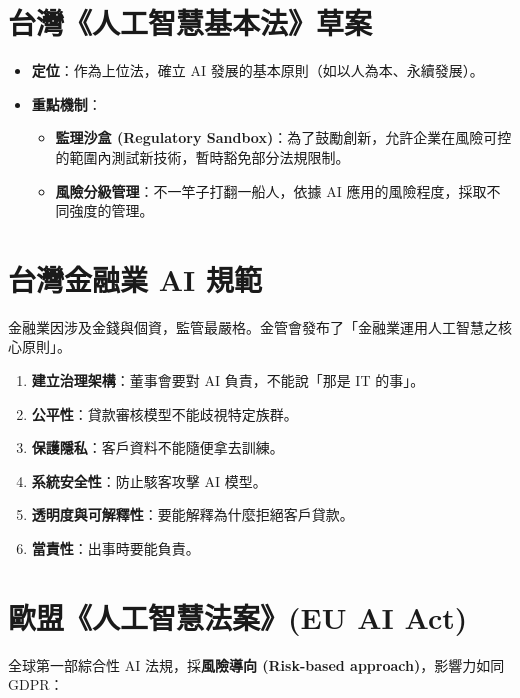 \documentclass[
  letterpaper,
  DIV=11,
  numbers=noendperiod]{scrreprt}
\providecommand{\tightlist}{%
  \setlength{\itemsep}{0pt}\setlength{\parskip}{0pt}}
\begin{document}
\section{台灣《人工智慧基本法》草案}\label{sec-taiwan-ai-law}

\begin{itemize}
\tightlist
\item
  \textbf{定位}：作為上位法，確立 AI
  發展的基本原則（如以人為本、永續發展）。
\item
  \textbf{重點機制}：

  \begin{itemize}
  \tightlist
  \item
    \textbf{監理沙盒 (Regulatory
    Sandbox)}：為了鼓勵創新，允許企業在風險可控的範圍內測試新技術，暫時豁免部分法規限制。
  \item
    \textbf{風險分級管理}：不一竿子打翻一船人，依據 AI
    應用的風險程度，採取不同強度的管理。
  \end{itemize}
\end{itemize}

\section{台灣金融業 AI 規範}\label{sec-financial-ai}

金融業因涉及金錢與個資，監管最嚴格。金管會發布了「金融業運用人工智慧之核心原則」。

\begin{enumerate}
\def\labelenumi{\arabic{enumi}.}
\tightlist
\item
  \textbf{建立治理架構}：董事會要對 AI 負責，不能說「那是 IT 的事」。
\item
  \textbf{公平性}：貸款審核模型不能歧視特定族群。
\item
  \textbf{保護隱私}：客戶資料不能隨便拿去訓練。
\item
  \textbf{系統安全性}：防止駭客攻擊 AI 模型。
\item
  \textbf{透明度與可解釋性}：要能解釋為什麼拒絕客戶貸款。
\item
  \textbf{當責性}：出事時要能負責。
\end{enumerate}

\section{歐盟《人工智慧法案》(EU AI Act)}\label{sec-eu-ai-act}

全球第一部綜合性 AI 法規，採\textbf{風險導向 (Risk-based
approach)}，影響力如同 GDPR：
\end{document}
